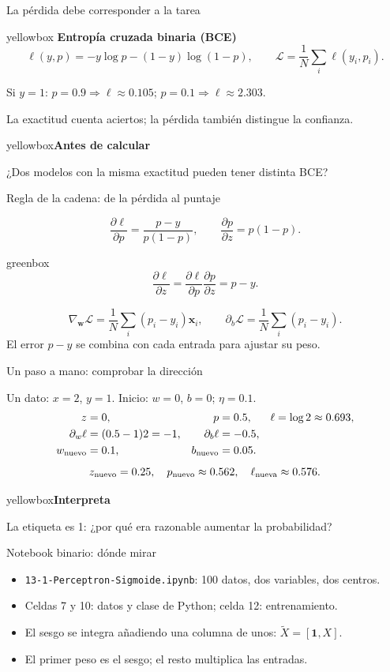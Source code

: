 \documentclass[10pt,aspectratio=169,xcolor={dvipsnames}]{beamer}
\newenvironment{caja}[1][lgraybox]{\begin{beamercolorbox}[sep=0.7em,wd=\linewidth]{#1}}{\end{beamercolorbox}}
\newcommand{\actividad}[2]{\begin{caja}[yellowbox]\textbf{#1}\par\smallskip #2\end{caja}}
\begin{document}
\begin{frame}{La pérdida debe corresponder a la tarea}

\begin{caja}[yellowbox]
\textbf{Entropía cruzada binaria (BCE)}
\[\ell(y,p)=-y\log p-(1-y)\log(1-p),\qquad
\mathcal L=\frac1N\sum_i\ell(y_i,p_i).\]
\end{caja}
Si $y=1$: $p=0.9\Rightarrow\ell\approx0.105$;
$p=0.1\Rightarrow\ell\approx2.303$.\par\bigskip
La exactitud cuenta aciertos; la pérdida también distingue la confianza.
\actividad{Antes de calcular}{¿Dos modelos con la misma exactitud pueden tener distinta BCE?}
\end{frame}

\begin{frame}{Regla de la cadena: de la pérdida al puntaje}

\[\frac{\partial\ell}{\partial p}=\frac{p-y}{p(1-p)},
\qquad\frac{\partial p}{\partial z}=p(1-p).\]
\begin{caja}[greenbox]\centering
\[\frac{\partial\ell}{\partial z}
=\frac{\partial\ell}{\partial p}\frac{\partial p}{\partial z}=p-y.\]
\end{caja}
\[\nabla_{\bm w}\mathcal L=\frac1N\sum_i(p_i-y_i)\bm x_i,
\qquad\partial_b\mathcal L=\frac1N\sum_i(p_i-y_i).\]
El error $p-y$ se combina con cada entrada para ajustar su peso.
\note{}
\end{frame}

\begin{frame}{Un paso a mano: comprobar la dirección}

Un dato: $x=2$, $y=1$. Inicio: $w=0$, $b=0$; $\eta=0.1$.
\begin{align*}
z&=0,&p&=0.5,&\ell&=\log2\approx0.693,\\
\partial_w\ell&=(0.5-1)2=-1,&\partial_b\ell&=-0.5,\\
w_{\rm nuevo}&=0.1,&b_{\rm nuevo}&=0.05.
\end{align*}
\[z_{\rm nuevo}=0.25,\quad p_{\rm nuevo}\approx0.562,
\quad\ell_{\rm nueva}\approx0.576.\]
\actividad{Interpreta}{La etiqueta es 1: ¿por qué era razonable aumentar la probabilidad?}
\note{}
\end{frame}

\begin{frame}{Notebook binario: dónde mirar}
\begin{itemize}
\item \texttt{13-1-Perceptron-Sigmoide.ipynb}: 100 datos, dos variables, dos centros.
\item Celdas 7 y 10: datos y clase de Python; celda 12: entrenamiento.
\item El sesgo se integra añadiendo una columna de unos: $\tilde X=[\bm1,X]$.
\item El primer peso es el sesgo; el resto multiplica las entradas.
\end{itemize}
\end{frame}
\end{document}
